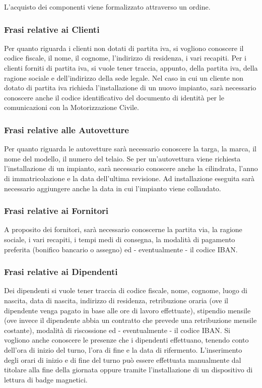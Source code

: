 			L'acquisto dei componenti viene formalizzato attraverso un ordine.
			
		\subsubsection{Frasi relative ai Clienti}
		
			Per quanto riguarda i clienti non dotati di partita iva, si vogliono conoscere il codice fiscale, il nome, il cognome, l’indirizzo di residenza, i vari recapiti. Per i clienti forniti di partita iva, si vuole tener traccia, appunto, della partita iva, della ragione sociale e dell’indirizzo della sede legale. 
			Nel caso in cui un cliente non dotato di partita iva richieda l’installazione di un nuovo impianto, sarà necessario conoscere anche il codice identificativo del documento di identità per le comunicazioni con la Motorizzazione Civile.
		
		\subsubsection{Frasi relative alle Autovetture}
			
			Per quanto riguarda le autovetture sarà necessario conoscere la targa, la marca, il nome del modello, il numero del telaio. Se per un’autovettura viene richiesta l’installazione di un impianto, sarà necessario conoscere anche la cilindrata, l’anno di immatricolazione e la data dell’ultima revisione. Ad installazione eseguita sarà necessario aggiungere anche la data in cui l'impianto viene collaudato.
		
		\subsubsection{Frasi relative ai Fornitori}
			
			A proposito dei fornitori, sarà necessario conoscerne la partita via, la ragione sociale, i vari recapiti, i tempi medi di consegna, la modalità di pagamento preferita (bonifico bancario o assegno) ed - eventualmente - il codice IBAN.
		
		\subsubsection{Frasi relative ai Dipendenti} 
			
			Dei dipendenti si vuole tener traccia di codice fiscale, nome, cognome, luogo di nascita, data di nascita, indirizzo di residenza, retribuzione oraria (ove il dipendente venga pagato in base alle ore di lavoro effettuate), stipendio mensile (ove invece il dipendente abbia un contratto che prevede una retribuzione mensile costante), modalità di riscossione ed - eventualmente - il codice IBAN. Si vogliono anche conoscere le presenze che i dipendenti effettuano, tenendo conto dell’ora di inizio del turno, l’ora di fine e la data di rifermento. 
			L'inserimento degli orari di inizio e di fine del turno può essere effettuata manualmente dal titolare alla fine della giornata oppure tramite l'installazione di un dispositivo di lettura di badge magnetici.
			

